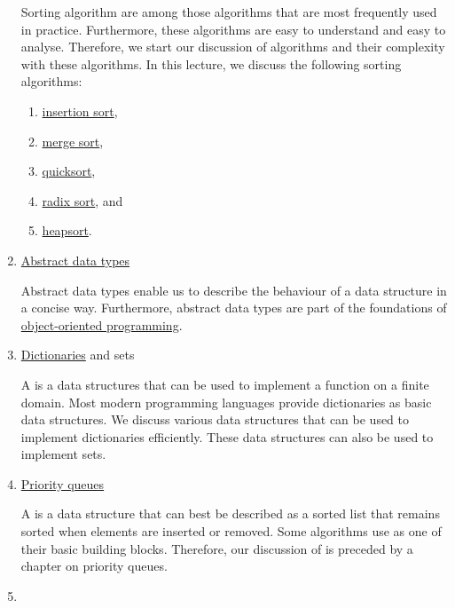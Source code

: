 \begin{enumerate}
      Sorting algorithm are among those algorithms that are most frequently used in practice.  Furthermore,
      these algorithms are easy to understand and easy to analyse.  Therefore, we start our discussion of
      algorithms and their complexity with these algorithms.  In this lecture, we discuss the following
      sorting algorithms: 
      \begin{enumerate}
      \item \href{http://en.wikipedia.org/wiki/Insertion_sort}{insertion sort},
      \item \href{http://en.wikipedia.org/wiki/Merge_sort}{merge sort}, 
      \item \href{http://en.wikipedia.org/wiki/Quicksort}{quicksort}, 
      \item \href{http://en.wikipedia.org/wiki/Radix_sort}{radix sort}, and
      \item \href{https://en.wikipedia.org/wiki/Heapsort}{heapsort}.
      \end{enumerate}  
\item \href{http://en.wikipedia.org/wiki/Abstract_data_types}{Abstract data types}

      Abstract data types enable us to describe the behaviour of a data structure in a concise way.
      Furthermore, abstract data types are part of the foundations of 
      \href{https://en.wikipedia.org/wiki/Object-oriented_programming}{object-oriented programming}.
%  

\item \href{http://en.wikipedia.org/wiki/Map_(computer_science)}{Dictionaries} and sets
  
      A  is a data structures that can be used to implement a function on a finite domain.
      Most modern programming languages provide dictionaries as basic data structures.  We discuss various data
      structures that can be used to implement dictionaries efficiently.   
      These data structures can also be used to implement sets.
\item \href{http://en.wikipedia.org/wiki/Priority_queue}{Priority queues}

      A  is a data structure that can best be described as a sorted list that remains
      sorted when elements are inserted or removed.
      Some  algorithms use  as one of their basic building blocks.
      Therefore, our discussion of  is preceded by a chapter on priority queues.
\item {}


\end{enumerate}
